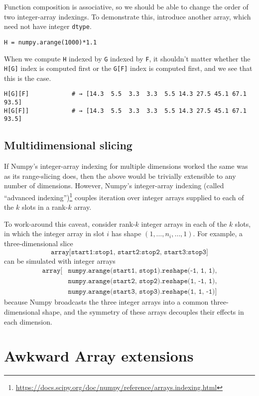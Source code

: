 \documentclass[12pt]{article}
\begin{document}
Function composition is associative, so we should be able to change the order of two integer-array indexings. To demonstrate this, introduce another array, which need not have integer \texttt{dtype}.
\begin{verbatim}
H = numpy.arange(1000)*1.1
\end{verbatim}
\noindent When we compute \texttt{H} indexed by \texttt{G} indexed by \texttt{F}, it shouldn't matter whether the \texttt{H[G]} index is computed first or the \texttt{G[F]} index is computed first, and we see that this is the case.
\begin{verbatim}
H[G][F]            # → [14.3  5.5  3.3  3.3  5.5 14.3 27.5 45.1 67.1 93.5]
H[G[F]]            # → [14.3  5.5  3.3  3.3  5.5 14.3 27.5 45.1 67.1 93.5]
\end{verbatim}

\subsection*{Multidimensional slicing}

If Numpy's integer-array indexing for multiple dimensions worked the same was as its range-slicing does, then the above would be trivially extensible to any number of dimensions. However, Numpy's integer-array indexing (called ``advanced indexing'')\footnote{\url{https://docs.scipy.org/doc/numpy/reference/arrays.indexing.html}} couples iteration over integer arrays supplied to each of the $k$ slots in a rank-$k$ array.

To work-around this caveat, consider rank-$k$ integer arrays in each of the $k$ slots, in which the integer array in slot $i$ has shape $(1, \ldots, n_i, \ldots, 1)$. For example, a three-dimensional slice
\[ \texttt{array[start1:stop1, start2:stop2, start3:stop3]} \]
\noindent can be simulated with integer arrays
\begin{align*}
\texttt{array[} & \texttt{numpy.arange(start1, stop1).reshape(-1, 1, 1),} \\
                            & \texttt{numpy.arange(start2, stop2).reshape(1, -1, 1),} \\
                            & \texttt{numpy.arange(start3, stop3).reshape(1, 1, -1)]}
\end{align*}
\noindent because Numpy broadcasts the three integer arrays into a common three-dimensional shape, and the symmetry of these arrays decouples their effects in each dimension.

\section*{Awkward Array extensions}
\end{document}

